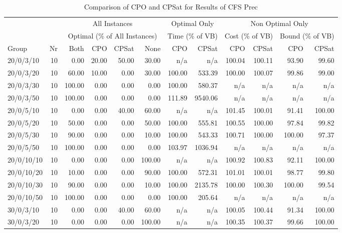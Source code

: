 \begin{table}[htbp]
\caption{\label{tab:comparecfsprec}Comparison of CPO and CPSat for Results of CFS Prec}
{\scriptsize
\begin{tabular}{lr*{10}{r}} \toprule
& &\multicolumn{4}{c}{All Instances} & \multicolumn{2}{c}{Optimal Only} & \multicolumn{4}{c}{Non Optimal Only}\\ 
& &\multicolumn{4}{c}{Optimal (\% of All Instances)} & \multicolumn{2}{c}{Time (\% of VB)} & \multicolumn{2}{c}{Cost (\% of VB)} & \multicolumn{2}{c}{Bound (\% of VB)}\\ 
Group & Nr & Both & CPO & CPSat & None & CPO & CPSat & CPO & CPSat & CPO & CPSat\\ \midrule
20/0/3/10 & 10 &  0.00 & 20.00 & 50.00 & 30.00 & n/a & n/a & 100.04 & 100.11 & 93.90 & 99.60 \\ 
20/0/3/20 & 10 & 60.00 & 10.00 &  0.00 & 30.00 & 100.00 & 533.39 & 100.00 & 100.07 & 99.86 & 99.00 \\ 
20/0/3/30 & 10 & 100.00 &  0.00 &  0.00 &  0.00 & 100.00 & 580.37 & n/a & n/a & n/a & n/a \\ 
20/0/3/50 & 10 & 100.00 &  0.00 &  0.00 &  0.00 & 111.89 & 9540.06 & n/a & n/a & n/a & n/a \\ 
20/0/5/10 & 10 &  0.00 &  0.00 & 40.00 & 60.00 & n/a & n/a & 101.45 & 100.01 & 91.41 & 100.00 \\ 
20/0/5/20 & 10 & 50.00 &  0.00 &  0.00 & 50.00 & 100.00 & 555.81 & 100.55 & 100.00 & 97.84 & 99.82 \\ 
20/0/5/30 & 10 & 90.00 &  0.00 &  0.00 & 10.00 & 100.00 & 543.33 & 100.71 & 100.00 & 100.00 & 97.37 \\ 
20/0/5/50 & 10 & 100.00 &  0.00 &  0.00 &  0.00 & 103.97 & 1036.94 & n/a & n/a & n/a & n/a \\ 
20/0/10/10 & 10 &  0.00 &  0.00 &  0.00 & 100.00 & n/a & n/a & 100.92 & 100.83 & 92.11 & 100.00 \\ 
20/0/10/20 & 10 & 10.00 &  0.00 &  0.00 & 90.00 & 100.00 & 572.31 & 101.01 & 100.01 & 98.77 & 99.80 \\ 
20/0/10/30 & 10 & 90.00 &  0.00 &  0.00 & 10.00 & 100.00 & 2135.78 & 100.00 & 100.30 & 100.00 & 99.54 \\ 
20/0/10/50 & 10 & 100.00 &  0.00 &  0.00 &  0.00 & 100.00 & 205.64 & n/a & n/a & n/a & n/a \\ 
30/0/3/10 & 10 &  0.00 &  0.00 & 40.00 & 60.00 & n/a & n/a & 100.05 & 100.44 & 91.34 & 100.00 \\ 
30/0/3/20 & 10 &  0.00 &  0.00 &  0.00 & 100.00 & n/a & n/a & 100.35 & 100.37 & 99.66 & 100.00 \\ 

\end{tabular}}
\end{table}
